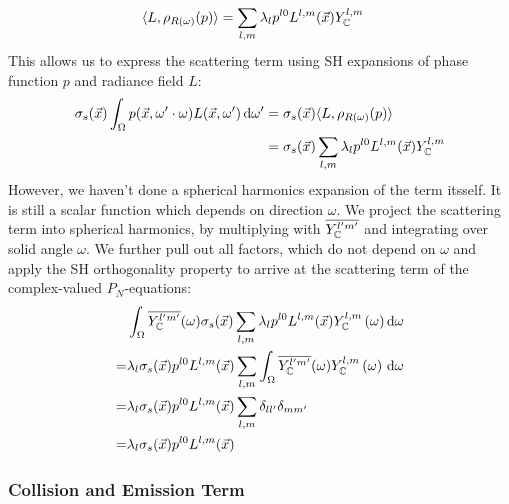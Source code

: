 \begin{align*}
\langle L,  \rho_{R(\omega)}(p)\rangle
&=
\sum_{l,m}
{
\lambda_l
p^{l0}L^{l,m}(\vec{x})
Y_{\mathbb{C}}^{l,m}
}
\end{align*}
This allows us to express the scattering term using SH expansions of phase function $p$ and radiance field $L$:
\begin{align*}
\sigma_s(\vec{x})\int_{\Omega}p(\vec{x}, \omega'\cdot\omega)L(\vec{x}, \omega')\,\mathrm{d}\omega'
&=
\sigma_s(\vec{x})\langle L,  \rho_{R(\omega)}(p)\rangle
\\
&=
\sigma_s(\vec{x})
\sum_{l,m}
{
\lambda_l
p^{l0}L^{l,m}(\vec{x})
Y_{\mathbb{C}}^{l,m}
}
\end{align*}
However, we haven't done a spherical harmonics expansion of the term itsself. It is still a scalar function which depends on direction $\omega$. We project the scattering term into spherical harmonics, by multiplying with $\overline {Y_{\mathbb{C}}^{l'm'}}$ and integrating over solid angle $\omega$. We further pull out all factors, which do not depend on $\omega$ and apply the SH orthogonality property to arrive at the scattering term of the complex-valued $P_N$-equations:
\begin{align}
&
\int_{\Omega}
{
\overline{Y_{\mathbb{C}}^{l'm'}}(\omega)
\sigma_s(\vec{x})
\sum_{l,m}
{
\lambda_l
p^{l0}L^{l,m}(\vec{x})
Y_{\mathbb{C}}^{l,m}\left(\omega\right)
}
\,\mathrm{d}\omega
}
\nonumber\\
=&
\lambda_l
\sigma_s(\vec{x})
p^{l0}L^{l,m}(\vec{x})
\sum_{l,m}
{
\int_{\Omega}
{
\overline{Y_{\mathbb{C}}^{l'm'}}(\omega)
Y_{\mathbb{C}}^{l,m}\left(\omega\right)
\,\mathrm{d}\omega
}
}
\nonumber\\
=&
\lambda_l
\sigma_s(\vec{x})
p^{l0}L^{l,m}(\vec{x})
\sum_{l,m}
{
\delta_{ll'}\delta_{mm'}
}
\nonumber\\
=&
\lambda_l
\sigma_s(\vec{x})
p^{l0}L^{l,m}(\vec{x})
\label{eq:sh_complex_scattering}
\end{align}



\subsubsection*{Collision and Emission Term}

